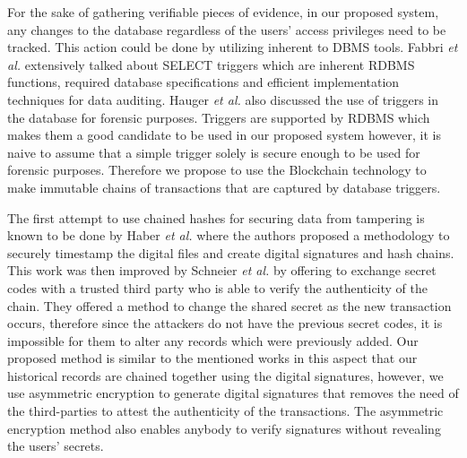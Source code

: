 		For the sake of gathering verifiable pieces of evidence, in our proposed system, any changes to the database regardless of the users' access privileges need to be tracked. This action could be done by utilizing inherent to DBMS tools. Fabbri {\it et al.} \cite{fabbri2013select} extensively talked about SELECT triggers which are inherent RDBMS functions, required database specifications and efficient implementation techniques for data auditing. Hauger {\it et al.}\cite{hauger2014information} also discussed the use of triggers in the database for forensic purposes. Triggers are supported by RDBMS which makes them a good candidate to be used in our proposed system however, it is naive to assume that a simple trigger solely is secure enough to be used for forensic purposes. Therefore we propose to use the Blockchain technology to make immutable chains of transactions that are captured by database triggers.

		The first attempt to use chained hashes for securing data from tampering is known to be done by Haber {\it et al.} \cite{haber1991how} where the authors proposed a methodology to securely timestamp the digital files and create digital signatures and hash chains. This work was then improved by Schneier {\it et al.} \cite{schneier1998cryptoraphic} \cite{schneier1999minimizing} \cite{schneier1999secure} by offering to exchange secret codes with a trusted third party who is able to verify the authenticity of the chain. They offered a method to change the shared secret as the new transaction occurs, therefore since the attackers do not have the previous secret codes, it is impossible for them to alter any records which were previously added. Our proposed method is similar to the mentioned works in this aspect that our historical records are chained together using the digital signatures, however, we use asymmetric encryption to generate digital signatures that removes the need of the third-parties to attest the authenticity of the transactions. The asymmetric encryption method also enables anybody to verify signatures without revealing the users' secrets.